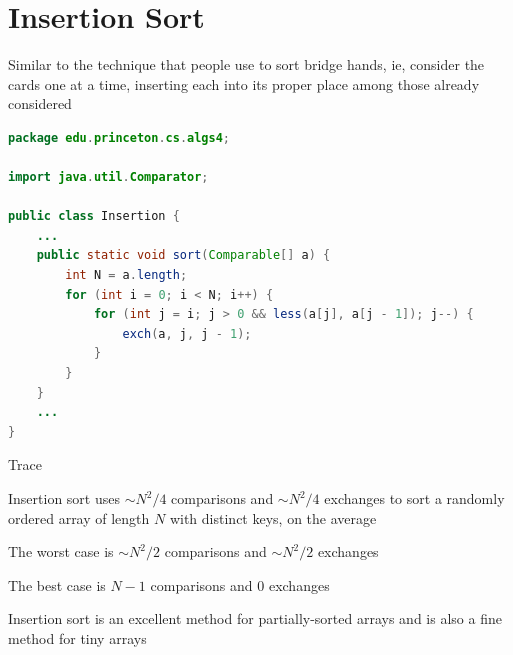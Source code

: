 \documentclass[8pt,a4paper,compress]{beamer}
\begin{document}
\section{Insertion Sort}
\begin{frame}[fragile]
\pause

Similar to the technique that people use to sort bridge hands, ie, consider the cards one at a time, inserting each into its proper place among those already considered

\pause
\bigskip

\begin{lstlisting}[language=Java]
package edu.princeton.cs.algs4;

import java.util.Comparator;

public class Insertion {
    ...
    public static void sort(Comparable[] a) {
        int N = a.length;
        for (int i = 0; i < N; i++) {
            for (int j = i; j > 0 && less(a[j], a[j - 1]); j--) {
                exch(a, j, j - 1);
            }
        }
    }
    ...
}
\end{lstlisting}
\end{frame}

\begin{frame}[fragile]
\pause

Trace
\begin{center}
\end{center}
\end{frame}

\begin{frame}[fragile]
\pause

Insertion sort uses $\sim N^2 /4$ comparisons and $\sim N^2 /4$ exchanges to sort a randomly ordered array of length $N$ with distinct keys, on the average

\pause
\bigskip

The worst case is $\sim N^2 /2$ comparisons and $\sim N^2/2$ exchanges

\pause
\bigskip

The best case is $N-1$ comparisons and 0 exchanges

\pause
\bigskip

Insertion sort is an excellent method for partially-sorted arrays and is also a fine method for tiny arrays
\end{frame}
\end{document}
